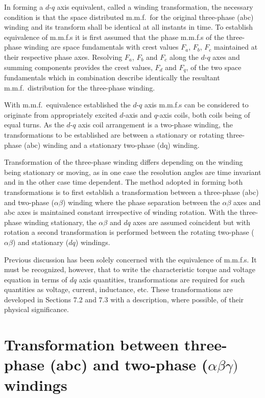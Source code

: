 \documentclass[a4paper,numbers=noenddot,12pt]{scrbook}
\begin{document}
In forming  a $d$-$q$ axis equivalent, called a winding transformation, the necessary condition is that the space distributed m.m.f.\ for the original three-phase (abc) winding and its transform shall be identical at all instants in time. To establish equivalence of m.m.f.s it is first assumed that the phase m.m.f.s of the three-phase winding are space fundamentals with crest values $F_a$, $F_b$, $F_c$ maintained at their respective phase axes. Resolving $F_a$, $F_b$ and $F_c$ along
the $d$-$q$ axes and summing components provides the crest values, $F_d$ and $F_q$, of the two space fundamentals which in combination describe identically the resultant m.m.f.\ distribution for the three-phase winding.

With m.m.f.\ equivalence established the $d$-$q$ axis m.m.f.s can be considered to originate from appropriately excited $d$-axis and $q$-axis coils, both coils being of equal turns. As the $d$-$q$ axis coil arrangement is a two-phase winding, the transformations to be established are between a stationary or rotating three-phase (abc) winding and a stationary two-phase (dq) winding.

Transformation of the three-phase winding differs depending on the winding being stationary or moving, as in one case the resolution angles are time invariant and in the other case time dependent. The method adopted in forming both transformations is to first establish a transformation between a three-phase (abc) and two-phase ($\alpha \beta$) winding where the phase separation between the $\alpha \beta$ axes and abc axes is maintained constant irrespective of winding rotation. With
the three-phase winding stationary, the $\alpha \beta$ and $dq$ axes are assumed coincident but with rotation a second transformation is performed between the rotating two-phase ($\alpha \beta$) and stationary ($dq$) windings.

Previous discussion has been solely concerned with the equivalence of m.m.f.s. It must be recognized, however, that to write the characteristic torque and voltage equation in terms of $dq$ axis quantities, transformations are required for such quantities as voltage, current, inductance, etc. These transformations are developed in Sections 7.2 and 7.3 with a description, where possible, of their physical significance.

\section{Transformation between three-phase {\mdseries(abc)} and two-phase \textrm{($\alpha \beta \gamma)$} windings}
\end{document}

